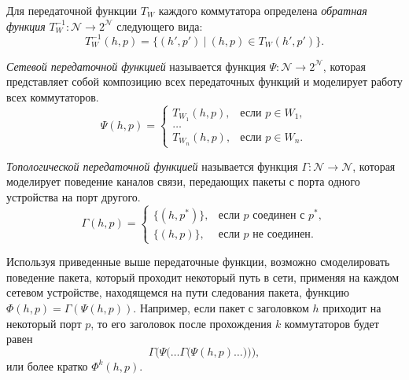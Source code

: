 \documentclass[../thesis.tex]{subfiles}
\begin{document}
Для передаточной функции $T_W$ каждого коммутатора определена \textit{обратная функция} $T^{-1}_W:\mathcal{N} \rightarrow 2^{\mathcal{N}}$ следующего вида:
\begin{equation}
T^{-1}_W(h,p) = \big\{ (h',p')\ |\ (h,p)\in T_W(h',p') \big\}.
\end{equation}

\textit{Сетевой передаточной функцией} называется функция $\Psi:\mathcal{N} \rightarrow 2^{\mathcal{N}}$, которая представляет собой композицию всех передаточных функций и моделирует работу всех коммутаторов.
\begin{equation}
\Psi(h,p) = 
\begin{cases}
    T_{W_1}(h,p),& \text{если } p\in W_1,\\
    \dots\\
    T_{W_n}(h,p),& \text{если } p\in W_n.
\end{cases}
\end{equation}

\textit{Топологической передаточной функцией} называется функция $\Gamma:\mathcal{N} \rightarrow \mathcal{N}$, которая моделирует поведение каналов связи, передающих пакеты с порта одного устройства на порт другого.
\begin{equation}
\Gamma(h,p) = 
\begin{cases}
    \big\{ (h,p^*) \big\},& \text{если } p \textit{ соединен с } p^*, \\
    \big\{ (h,p) \big\},& \text{если } p \textit{ не соединен}.
\end{cases}
\end{equation}

Используя приведенные выше передаточные функции, возможно смоделировать поведение пакета, который проходит некоторый путь в сети, применяя на каждом сетевом устройстве, находящемся на пути следования пакета, функцию $\Phi(h,p) = \Gamma(\Psi(h,p))$.
Например, если пакет с заголовком $h$ приходит на некоторый порт $p$, то его заголовок после прохождения $k$ коммутаторов будет равен
\begin{equation}
\Gamma\bigg(\Psi\Big(\dots\Gamma\big(\Psi(h,p)\dots\big)\Big)\bigg),
\end{equation}
или более кратко $\Phi^k(h,p)$.
\end{document}
